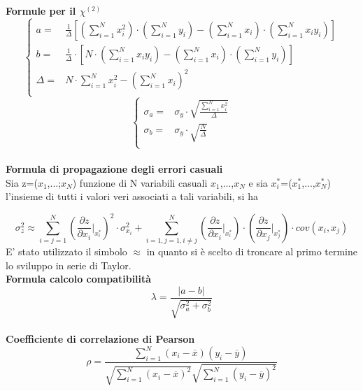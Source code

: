 \documentclass[a4paper,11pt,oneside]{article}
\begin{document}
\textbf{Formule per il ${\chi}^{(2)}$}
\begin{equation*}
        \begin{cases}
    a=&\frac{1}{\Delta}[(\sum\limits_{i=1}^{N}{x_{i}^{2}})\cdot(\sum\limits_{i=1}^{N}{y_{i}})-(\sum\limits_{i=1}^{N}{x_{i}})\cdot(\sum\limits_{i=1}^{N}{x_{i}y_{i}})] \\ 
    b=&\frac{1}{\Delta }\cdot \left [N\cdot \left ( \sum\limits_{i=1}^{N}x_i y_i \right )-\left ( \sum\limits_{i=1}^{N}x_i \right )\cdot \left ( \sum\limits_{i=1}^{N}y_i \right )  \right ]\\
    \Delta=& N\cdot \sum\limits_{i=1}^{N} x_i^{2} - \left ( \sum\limits_{i=1}^{N}x_i \right )^{2}\\
    \end{cases}
\end{equation*}
\begin{equation*}
    \begin{cases}
    \sigma_{a}=&\sigma_{y}\cdot\sqrt{\frac{\sum_{i=1}^{N}{x_{i}^{2}}}{\Delta}} \\
    \sigma_{b}=&\sigma_y\cdot \sqrt{\frac{N}{\Delta }}\\
    \end{cases}
    \label{equation:err_chi_quadro}
\end{equation*}
\\
\textbf{Formula di propagazione degli errori casuali}\\

Sia z=($x_1$,...;$x_N$) funzione di N variabili casuali $x_1$,...,$x_N$ e sia ${x_i^\ast}$=($x_1^\ast$,...,$x_N^{\ast}$) l'insieme di tutti i valori veri associati a tali variabili, si ha 

\begin{equation*}
    \sigma_z^{2}\approx  \sum_{i=j=1}^{N}\left ( \frac{\partial z}{\partial x_i}\Big|_{x_i^{\ast}} \right )^{2}\cdot\sigma_{x_i}^{2} +\sum_{i=1,j=1,i\neq j}^{N}\left (\frac{\partial z }{\partial x_i}\Big|_{x_i^{\ast}} \right ) \cdot \left ( \frac{\partial z}{\partial x_j} \Big|_{x_j^{\ast}} \right )\cdot cov(x_i,x_j)\label{eq:prop_errori}
\end{equation*}
E' stato utilizzato il simbolo $\approx$ in quanto si è scelto di troncare al primo termine lo sviluppo in serie di Taylor.\\


\textbf{Formula calcolo compatibilità}\\
\begin{equation*}
    \lambda=\frac{\left|a-b\right|}{\sqrt{\sigma^{2}_{a}+\sigma^{2}_{b}}}
\end{equation*}\\
\textbf{Coefficiente di correlazione di Pearson}\\
\begin{equation*}
    \rho=  \frac{\sum_{i=1}^{N}(x_i - \overline{x}
    )(y_i - \overline{y})}{\sqrt{\sum_{i=1}^{N}(x_i -\overline{x})^2}\sqrt{\sum_{i=1}^{N}(y_i - \overline{y})^2}}
\end{equation*}
\end{document}
